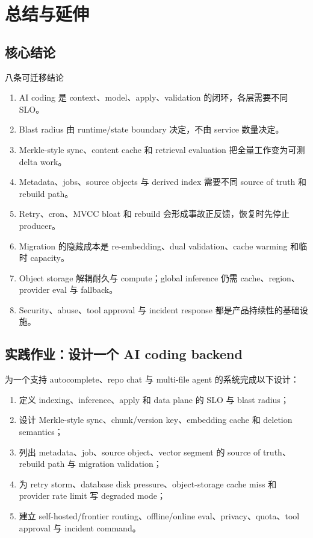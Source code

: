 \section{总结与延伸}

\subsection{核心结论}

\begin{importantbox}{八条可迁移结论}
\begin{enumerate}
  \item AI coding 是 context、model、apply、validation 的闭环，各层需要不同 SLO。
  \item Blast radius 由 runtime/state boundary 决定，不由 service 数量决定。
  \item Merkle-style sync、content cache 和 retrieval evaluation 把全量工作变为可测 delta work。
  \item Metadata、jobs、source objects 与 derived index 需要不同 source of truth 和 rebuild path。
  \item Retry、cron、MVCC bloat 和 rebuild 会形成事故正反馈，恢复时先停止 producer。
  \item Migration 的隐藏成本是 re-embedding、dual validation、cache warming 和临时 capacity。
  \item Object storage 解耦耐久与 compute；global inference 仍需 cache、region、provider eval 与 fallback。
  \item Security、abuse、tool approval 与 incident response 都是产品持续性的基础设施。
\end{enumerate}
\end{importantbox}

\subsection{实践作业：设计一个 AI coding backend}

为一个支持 autocomplete、repo chat 与 multi-file agent 的系统完成以下设计：

\begin{enumerate}
  \item 定义 indexing、inference、apply 和 data plane 的 SLO 与 blast radius；
  \item 设计 Merkle-style sync、chunk/version key、embedding cache 和 deletion semantics；
  \item 列出 metadata、job、source object、vector segment 的 source of truth、rebuild path 与 migration validation；
  \item 为 retry storm、database disk pressure、object-storage cache miss 和 provider rate limit 写 degraded mode；
  \item 建立 self-hosted/frontier routing、offline/online eval、privacy、quota、tool approval 与 incident command。
\end{enumerate}


